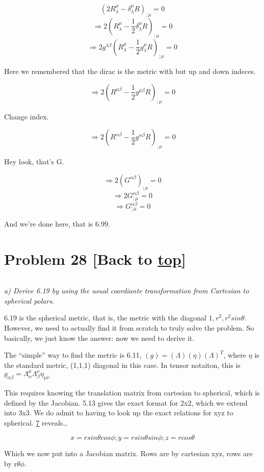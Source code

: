\documentclass[landscape,letterpaper,10pt,english]{article}
\begin{document}
\[ (2R^\mu_\lambda - \delta^\mu_\lambda R)_{;\mu} = 0\]
\[ \Rightarrow 2(R^\mu_\lambda - \frac12\delta^\mu_\lambda R)_{;\mu} = 0\]
\[ \Rightarrow 2g^{\lambda\beta}(R^\mu_\lambda - \frac12g^\mu_\lambda R)_{;\mu} = 0\]

Here we remembered that the dirac is the metric with but up and down
indeces.

\[ \Rightarrow 2(R^{\mu\beta} - \frac12g^{\mu\beta} R)_{;\mu} = 0\]

Change index.

\[ \Rightarrow 2(R^{\alpha\beta} - \frac12g^{\alpha\beta} R)_{;\mu} = 0\]

Hey look, that's G.

\[ \Rightarrow 2(G^{\alpha\beta})_{;\mu} = 0\]
\[ \Rightarrow 2G^{\alpha\beta}_{;\mu} = 0\]
\[ \Rightarrow G^{\alpha\beta}_{;\mu} = 0\]

And we're done here, that is 6.99.

    \hypertarget{problem-28-back-to-top}{%
\section{\texorpdfstring{Problem 28 {[}Back to
\hyperref[toc]{top}{]}}{Problem 28 {[}Back to {]}}}\label{problem-28-back-to-top}}

\[\label{P28}\]

\emph{a) Derive 6.19 by using the usual coordiante transformation from
Cartesian to spherical polars.}

    6.19 is the spherical metric, that is, the metric with the diagonal
\(1, r^2, r^2sin\theta\). However, we need to actually find it from
scratch to truly solve the problem. So basically, we just know the
answer: now we need to derive it.

The ``simple'' way to find the metric is 6.11,
\((g) = (\Lambda)(\eta)(\Lambda)^T\), where \(\eta\) is the standard
metric, (1,1,1) diagonal in this case. In tensor notaiton, this is
\(g_{\alpha\beta} = \Lambda^\mu_\alpha \Lambda^\nu_\beta \eta_{\mu\nu}\)

This requires knowing the translation matrix from cartesian to
spherical, which is defined by the Jacobian. 5.13 gives the exact format
for 2x2, which we extend into 3x3. We do admit to having to look up the
exact relations for xyz to spherical. \hyperref[7]{7} reveals\ldots{}

\[x=rsin\theta cos\phi; y = rsin\theta sin\phi; z = rcos\theta\]

Which we now put into a Jacobian matrix. Rows are by cartesian xyz, rows
are by r\(\theta\phi\).
\end{document}
